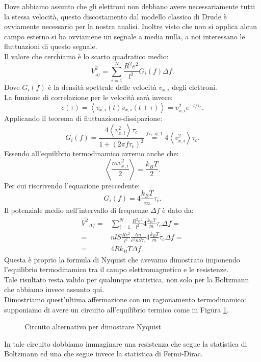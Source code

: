 Dove abbiamo assunto che gli elettroni non debbano avere necessariamente tutti la stessa velocità, questo discostamento dal modello classico di Drude è ovviamente necessario per la nostra analisi. Inoltre visto che non si applica alcun campo esterno si ha ovviamene un segnale a media nulla, a noi interessano le fluttuazioni di questo segnale.\\
Il valore che cerchiamo è lo scarto quadratico medio:
\[
	\overline{V_{_{\Delta f}}^2} = \sum_{i=1}^{N} \frac{R^2e^2}{l^2}G_i( f) \Delta f
.\] 
Dove $G_i(f)$ è la densità spettrale delle velocità $v_{x,i}$ degli elettroni.\\
La funzione di correlazione per le velocità sarà invece:
\[
	c( \tau ) 
	=
	\left<v_{x,i}( t) v_{x,i}( t+\tau )\right> 
	=
	v_{x,i}^2 e^{-t/\tau_c}
.\] 
Applicando il teorema di fluttuazione-dissipazione:
\[
	G_i(f) = 
	\frac{4\left<v_{x,i}^2 \right>\tau _c}{1 + \left( 2\pi f \tau _c \right)^2}
	\overset{\scriptstyle f\tau_c \ll 1}{=} 4 \left<v_{x,i}^2\right> \tau _c
.\] 
Essendo all'equilibrio termodinamico avremo anche che:
\[
	\left<\frac{mv_{x,i}^2}{2} \right> = \frac{k_B T}{2}
.\] 
Per cui riscrivendo l'equazione preccedente:
\[
	G_i(f)
	=
	4 \frac{k_BT}{m}\tau_c
.\] 
Il potenziale medio nell'intervallo di frequenze $\Delta f$ è dato da:
\[\begin{aligned}
	\overline{V^2}_{\Delta f} 
	=&
	\sum_{i = 1}^{N} 
	\frac{R^2e^2}{l^2}4 
	\frac{k_B T}{m}\tau_c\Delta f=\\
	=&
	nlS\frac{Re^2}{l^2}
	\frac{lm}{e^2nS\tau_c}4 
	\frac{k_B T}{m}\tau_c\Delta f=\\
	=&
	4Rk_BT\Delta f
.\end{aligned}\]
Questa è proprio la formula di Nyquist che avevamo dimostrato imponendo l'equilibrio termodinamico tra il campo elettromagnetico e le resistenze.\\
Tale risultato resta valido per qualunque statistica, non solo per la Boltzmann che abbiamo invece assunto qui.\\
Dimostriamo quest'ultima affermazione con un ragionamento termodinamico: supponiamo di avere un circuito all'equilibrio termico come in Figura \ref{fig:circuito-alternativo-per-dimostrare-nyquist}. 
\begin{figure}[ht]
    \centering
    \caption{Circuito alternativo per dimostrare Nyquist}
    \label{fig:circuito-alternativo-per-dimostrare-nyquist}
\end{figure}
In tale circuito dobbiamo immaginare una resistenza che segue la statistica di Boltzmann ed una che segue invece la statistica di Fermi-Dirac.\\
